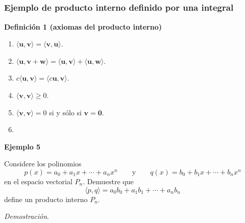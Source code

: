 
\subsection{}

{\nologo
\begin{frame}\frametitle{Ejemplo de producto interno definido por una integral}
	
	\begin{block}{\textbf{Definición 1 (axiomas del producto interno)}}	
		\begin{multicols}{2}		
			\begin{enumerate}			
				\justifying
				\item[\labelname{$a$}] $\langle \mathbf{u}, \mathbf{v}\rangle = \langle \mathbf{v}, \mathbf{u}\rangle$. \\%
				\item[\labelname{$b$}] $\langle \mathbf{u}, \mathbf{v}+\mathbf{w}\rangle 
				= \langle \mathbf{u}, \mathbf{v}\rangle + \langle \mathbf{u}, \mathbf{w}\rangle$. \\%
				\item[\labelname{$c$}] $c\langle \mathbf{u}, \mathbf{v}\rangle = \langle c\mathbf{u}, \mathbf{v}\rangle$.\\
				\columnbreak
				\item[\labelname{$d$}] $\langle \mathbf{v}, \mathbf{v}\rangle \geq 0 $. 
				\item[\labelname{$e$}] $\langle \mathbf{v}, \mathbf{v}\rangle = 0 $ si y sólo si $\mathbf{v}=\mathbf{0}$. 
				\item[]
			\end{enumerate}		
		\end{multicols}
		
	\end{block}
	
	\begin{ej}{\textbf{Ejemplo 5}}\justifying
		
		Considere los polinomios
		\[
		p(x) = a_0 + a_1x + \cdots + a_nx^n \qquad \text{y} \qquad q(x) = b_0 + b_1x + \cdots + b_nx^n
		\]
		en el espacio vectorial $P_n$. Demuestre que 
		\[
		\langle p, q\rangle = a_0b_0 + a_1b_1 + \cdots + a_nb_n
		\]
		define un producto interno $P_n$.
	\end{ej}
	\textit{Demostración}.
	
\end{frame}
}

